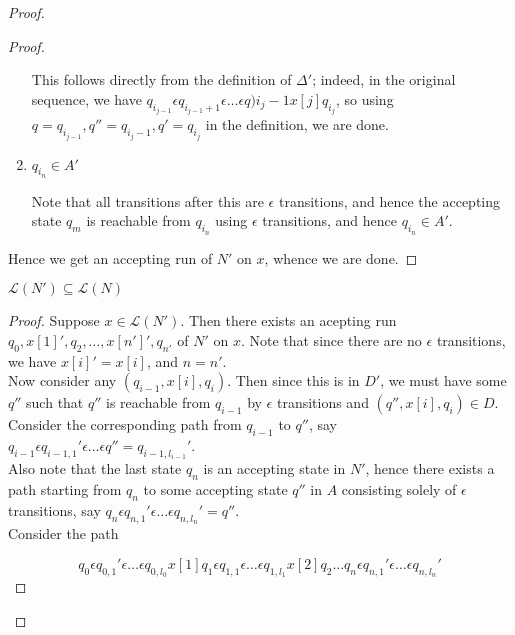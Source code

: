 \documentclass[a4paper]{article}
\newcommand{\mc}{\mathcal}
\begin{document}
\begin{proof}
\begin{proof}
\begin{enumerate}
                This follows directly from the definition of $\Delta'$; indeed, in the original sequence, we have $q_{i_{j-1}} \epsilon q_{i_{j-1}+1} \epsilon \ldots \epsilon q){i_j - 1} x[j]
                q_{i_j}$, so using $q = q_{i_{j-1}}, q'' = q_{i_j - 1}, q' = q_{i_j}$ in the definition, we are done.

            \item $q_{i_n} \in A'$

                Note that all transitions after this are $\epsilon$ transitions, and hence the accepting state $q_m$ is reachable from $q_{i_n}$ using $\epsilon$ transitions, and hence $q_{i_n} \in A'$.

        \end{enumerate}
        Hence we get an accepting run of $N'$ on $x$, whence we are done.
    \end{proof}


    \begin{claim}
        $\mc{L}(N') \subseteq \mc{L}(N)$
    \end{claim}


    \begin{proof}

        Suppose $x \in \mc{L}(N')$. Then there exists an acepting run $q_0, x[1]', q_2, \ldots, x[n']', q_{n'}$ of $N'$ on $x$. Note that since there are no $\epsilon$ transitions, we have $x[i]'
        = x[i]$, and $n = n'$.\\

        Now consider any $(q_{i - 1}, x[i], q_i)$. Then since this is in $D'$, we must have some $q''$ such that $q''$ is reachable from $q_{i - 1}$ by $\epsilon$ transitions and $(q'', x[i], q_i) \in
        D$.\\

        Consider the corresponding path from $q_{i - 1}$ to $q''$, say $q_{i - 1} \epsilon q_{i - 1, 1}' \epsilon \ldots \epsilon q'' = q_{i - 1, l_{i - 1}}'$.\\

        Also note that the last state $q_n$ is an accepting state in $N'$, hence there exists a path starting from $q_n$ to some accepting state $q''$ in $A$ consisting solely of $\epsilon$
        transitions, say $q_n \epsilon q_{n, 1}' \epsilon \ldots \epsilon q_{n, l_n}' = q''$.\\

        Consider the path

        $$q_0 \epsilon q_{0, 1}' \epsilon \ldots \epsilon q_{0, l_0} x[1] q_1 \epsilon q_{1, 1} \epsilon \ldots \epsilon q_{1, l_1} x[2] q_2 \ldots q_n \epsilon q_{n, 1}' \epsilon \ldots \epsilon
        q_{n, l_n}'$$


\end{proof}
\end{proof}
\end{document}
